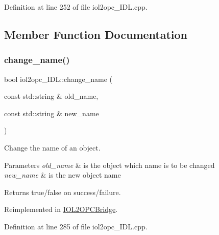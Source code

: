 Definition at line 252 of file iol2opc\+\_\+\+I\+D\+L.\+cpp.



\subsection{Member Function Documentation}
\mbox{\label{classiol2opc__IDL_a18ecf43816b0df1187a208df18fb98a7}} 
\subsubsection{\texorpdfstring{change\+\_\+name()}{change\_name()}}
{\footnotesize\ttfamily bool iol2opc\+\_\+\+I\+D\+L\+::change\+\_\+name (\begin{DoxyParamCaption}\item[{const std\+::string \&}]{old\+\_\+name,  }\item[{const std\+::string \&}]{new\+\_\+name }\end{DoxyParamCaption})\hspace{0.3cm}{\ttfamily [virtual]}}



Change the name of an object. 


\begin{DoxyParams}{Parameters}
{\em old\+\_\+name} & is the object which name is to be changed \\
\hline
{\em new\+\_\+name} & is the new object name \\
\hline
\end{DoxyParams}
\begin{DoxyReturn}{Returns}
true/false on success/failure. 
\end{DoxyReturn}


Reimplemented in \hyperlink{group__iol2opc_ae91edb0bb7a3b851e2387cda653d80fb}{I\+O\+L2\+O\+P\+C\+Bridge}.



Definition at line 285 of file iol2opc\+\_\+\+I\+D\+L.\+cpp.

\mbox{\label{classiol2opc__IDL_a51b8e076770a618ef676dd2ccdf4b35a}} 
